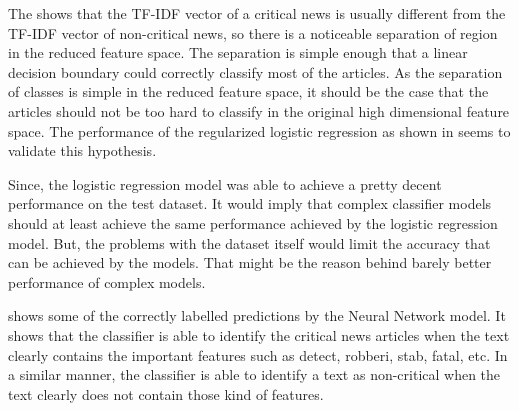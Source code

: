 The  shows that the TF-IDF vector of a critical news is usually different from the TF-IDF vector of non-critical news, so there is a noticeable separation of region in the reduced feature space. The separation is simple enough that a linear decision boundary could correctly classify most of the articles. As the separation of classes is simple in the reduced feature space, it should be the case that the articles should not be too hard to classify in the original high dimensional feature space. The performance of the regularized logistic regression as shown in  seems to validate this hypothesis.

Since, the logistic regression model was able to achieve a pretty decent performance on the test dataset. It would imply that complex classifier models should at least achieve the same performance achieved by the logistic regression model. But, the problems with the dataset itself would limit the accuracy that can be achieved by the models. That might be the reason behind
barely better performance of complex models.

 shows some of the correctly labelled predictions by the Neural Network model. It shows that the classifier is able to identify the critical news articles when the text clearly contains the important features such as detect, robberi, stab, fatal, etc. In a similar manner, the classifier is able to identify a text as non-critical when the text clearly
does not contain those kind of features.

